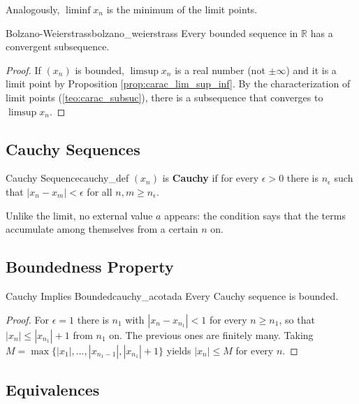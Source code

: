 \documentclass[11pt, a4paper]{article}
\begin{document}
Analogously, $\liminf x_n$ is the minimum of the limit points.

\begin{teorema}{Bolzano-Weierstrass}{bolzano_weierstrass}
Every bounded sequence in $\mathbb{R}$ has a convergent subsequence.
\end{teorema}

\begin{proof}
If $(x_n)$ is bounded, $\limsup x_n$ is a real number (not $\pm\infty$) and it is a limit point by
Proposition \ref{prop:carac_lim_sup_inf}. By the characterization of limit points
(\ref{teo:carac_subsuc}), there is a subsequence that
converges to $\limsup x_n$.
\end{proof}

\subsection{Cauchy Sequences}

\begin{definicion}{Cauchy Sequence}{cauchy_def}
$(x_n)$ is \textbf{Cauchy} if for every $\epsilon > 0$ there is $n_\epsilon$ such that
$|x_n - x_m| < \epsilon$ for all $n, m \ge n_\epsilon$.
\end{definicion}

\obs Unlike the limit, no external value $a$ appears: the condition says that the
terms accumulate among themselves from a certain $n$ on.

\subsection{Boundedness Property}

\begin{teorema}{Cauchy Implies Bounded}{cauchy_acotada}
Every Cauchy sequence is bounded.
\end{teorema}

\begin{proof}
For $\epsilon = 1$ there is $n_1$ with $|x_n - x_{n_1}| < 1$ for every $n \ge n_1$, so that
$|x_n| \le |x_{n_1}| + 1$ from $n_1$ on. The previous ones are finitely many. Taking
$M = \max\{|x_1|, \dots, |x_{n_1-1}|, |x_{n_1}|+1\}$ yields $|x_n| \le M$ for every $n$.
\end{proof}

\subsection{Equivalences}
\end{document}

